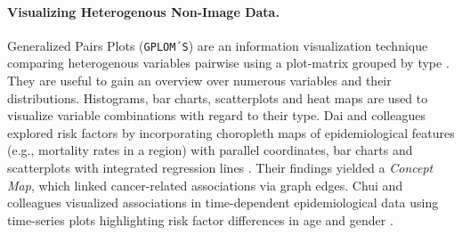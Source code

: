 \documentclass[journal]{style/vgtc} 			          %
\begin{document}
\paragraph{Visualizing Heterogenous Non-Image Data.}
Generalized Pairs Plots (\texttt{GPLOM´S}) are an information visualization technique comparing heterogenous variables pairwise using a plot-matrix grouped by type \cite{Francois2013}.
%
They are useful to gain an overview over numerous variables and their distributions.
%
Histograms, bar charts, scatterplots and heat maps are used to visualize variable combinations with regard to their type.
%
%
%
%
Dai and colleagues explored risk factors by incorporating choropleth maps of epidemiological features (e.g., mortality rates in a region) with parallel coordinates, bar charts and scatterplots with integrated regression lines \cite{Dai2005}.
%
Their findings yielded a \emph{Concept Map}, which linked cancer-related associations via graph edges.
Chui and colleagues visualized associations in time-dependent epidemiological data using time-series plots highlighting risk factor differences in age and gender \cite{Chui2011}.
\end{document}
